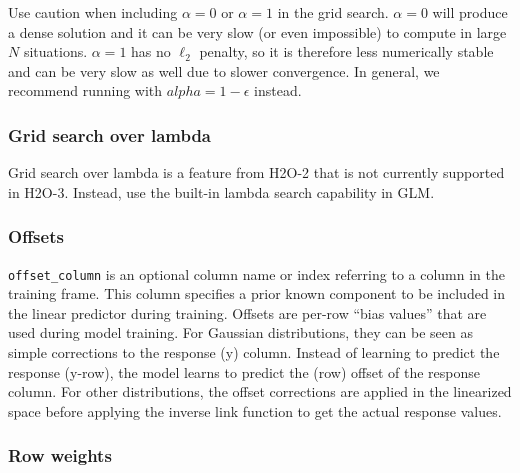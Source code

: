 Use caution when including $\alpha=0$ or $\alpha=1$ in the grid search. $\alpha=0$ will produce a dense solution
and it can be very slow (or even impossible) to compute in large $N$ situations. $\alpha=1$ has no  $\ell_2$ penalty, so
it is therefore less numerically stable and can be very slow as well due to slower convergence. In general, we recommend running with $alpha=1-\epsilon$ instead.

\waterExampleInR


\subsubsection{Grid search over lambda}


% 

Grid search over lambda is a feature from H2O-2 that is not currently supported in H2O-3.  Instead, use the built-in lambda
search capability in GLM.

\subsubsection{Offsets}

\texttt{offset\_column} is an optional column name or index referring to a column in the training frame. This column specifies a prior known component to be included in the linear predictor during training. Offsets are per-row “bias values” that are used during model training. For Gaussian distributions, they can be seen as simple corrections to the response (y) column. Instead of learning to predict the response (y-row), the model learns to predict the (row) offset of the response column. For other distributions, the offset corrections are applied in the linearized space before applying the inverse link function to get the actual response values.  

\subsubsection{Row weights}

